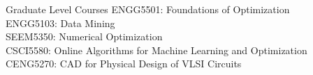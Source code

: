 \begin{rSection}{Graduate Level Courses}
    ENGG5501: Foundations of Optimization \\ 
    ENGG5103: Data Mining \\
    SEEM5350: Numerical Optimization \\
    CSCI5580: Online Algorithms for Machine Learning and Optimization \\
    CENG5270: CAD for Physical Design of VLSI Circuits
\end{rSection}
